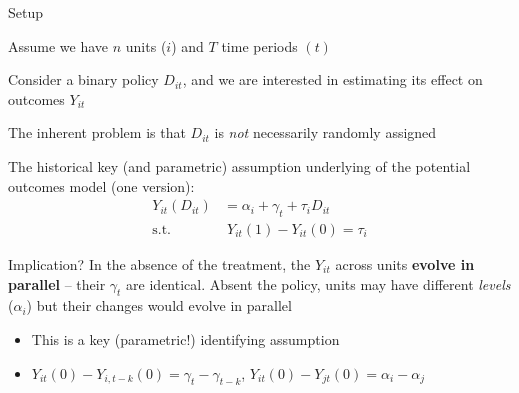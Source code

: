 \documentclass[notes,11pt, aspectratio=169]{beamer}
\newenvironment{wideitemize}{\itemize\addtolength{\itemsep}{10pt}}{\enditemize}
\begin{document}
\begin{frame}{Setup }
  \begin{wideitemize}
  \item Assume we have $n$ units ($i$) and $T$ time periods $(t)$
  \item Consider a binary policy $D_{it}$, and we are interested
    in estimating its effect on outcomes $Y_{it}$
  \item The inherent problem is that $D_{it}$ is \emph{not}
    necessarily randomly assigned
  \item The historical key (and parametric) assumption underlying of
    the potential outcomes model (one version):
    \begin{align*}
      Y_{it}(D_{it}) &= \alpha_{i} + \gamma_{t} + \tau_{i}D_{it}\\
      \text{s.t.} &\; Y_{it}(1) - Y_{it}(0)=  \tau_{i}
    \end{align*}
  \item Implication? In the absence of the treatment, the $Y_{it}$
    across units \textbf{evolve in parallel} -- their $\gamma_{t}$ are
    identical. Absent the policy, units may have different
    \emph{levels} ($\alpha_{i}$) but their changes would evolve in
    parallel
    \begin{itemize}
    \item This is a key (parametric!) identifying assumption
    \item $Y_{it}(0) - Y_{i,t-k}(0) = \gamma_{t} - \gamma_{t-k}$, $Y_{it}(0) - Y_{jt}(0) = \alpha_{i} -\alpha_{j}$
    \end{itemize}
  \end{wideitemize}
\end{frame}
\end{document}
